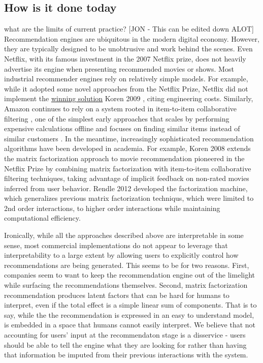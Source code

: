 \subsection{How is it done today}
what are the limits of current practice?
[JON - This can be edited down ALOT]
Recommendation engines are ubiquitous in the modern digital economy. However, they are typically designed to be unobtrusive and work behind the scenes. Even Netflix, with its famous investment in the 2007 Netflix prize, does not heavily advertise its engine when presenting recommended movies or shows. Most industrial recommender engines rely on relatively simple models. For example, while it adopted some novel approaches from the Netflix Prize, Netflix did not implement the \href{https://www.wired.com/2012/04/netflix-prize-costs/}{winning solution} Koren 2009 \cite{koren2009bellkor}, citing engineering costs. Similarly, Amazon continues to rely on a system rooted in item-to-item collaborative filtering \cite{smith2017two}, one of the simplest early approaches that scales by performing expensive calculations offline and focuses on finding similar items instead of similar customers \cite{linden2003amazon}. In the meantime, increasingly sophisticated recommendation algorithms have been developed in academia. For example, Koren 2008 \cite{koren2008factorization} extends the matrix factorization approach to movie recommendation pioneered \cite{funk2006netflix} in the Netflix Prize by combining matrix factorization with item-to-item collaborative filtering techniques, taking advantage of implicit feedback on non-rated movies inferred from user behavior. Rendle 2012 \cite{rendle2012factorization} developed the factorization machine, which generalizes previous matrix factorization techniqus, which were limited to 2nd order interactions, to higher order interactions while maintaining computational efficiency.

Ironically, while all the approaches described above are interpretable in some sense, most commercial implementations do not appear to leverage that interpretability to a large extent by allowing users to explicitly control how recommendations are being generated. This seems to be for two reasons. First, companies seem to want to keep the recommendation engine out of the limelight while surfacing the recommendations themselves. Second, matrix factorization recommendation produces latent factors that can be hard for humans to interpret, even if the total effect is a simple linear sum of components. That is to say, while the the recommendation is expressed in an easy to understand model, is embedded in a space that humans cannot easily interpret. We believe that not accounting for users' input at the recommendaton stage is a disservice - users should be able to tell the engine what they are looking for rather than having that information be imputed from their previous interactions with the system. 
